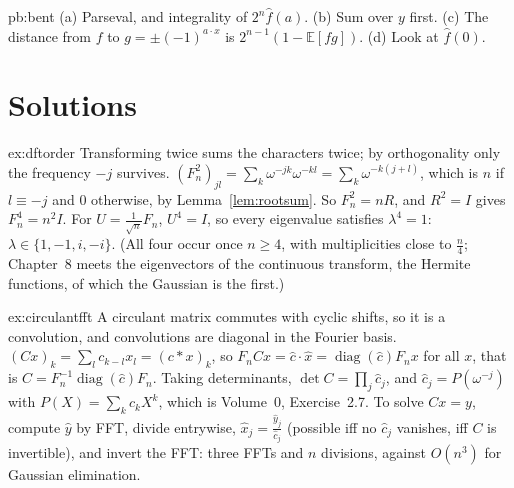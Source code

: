 \begin{hint}{pb:bent}
(a) Parseval, and integrality of $2^n\hat f(a)$. (b) Sum over $y$ first. (c) The distance from $f$ to $g=\pm(-1)^{a\cdot x}$ is
$2^{n-1}(1-\mathbb E[fg])$. (d) Look at $\hat f(0)$.
\end{hint}

\section{Solutions}

\begin{solution}{ex:dftorder}
\idea Transforming twice sums the characters twice; by orthogonality only the frequency $-j$ survives.
\writeup $(F_n^2)_{jl}=\sum_k\omega^{-jk}\omega^{-kl}=\sum_k\omega^{-k(j+l)}$, which is $n$ if $l\equiv-j$ and $0$ otherwise, by Lemma~\ref{lem:rootsum}. So $F_n^2=nR$, and
$R^2=I$ gives $F_n^4=n^2I$. For $U=\frac1{\sqrt n}F_n$, $U^4=I$, so every eigenvalue satisfies $\lambda^4=1$: $\lambda\in\{1,-1,i,-i\}$. (All four occur once
$n\ge4$, with multiplicities close to $\frac n4$; Chapter~8 meets the eigenvectors of the continuous transform, the Hermite
functions, of which the Gaussian is the first.)
\end{solution}

\begin{solution}{ex:circulantfft}
\idea A circulant matrix commutes with cyclic shifts, so it is a convolution, and convolutions are diagonal in the Fourier
basis.
\writeup $(Cx)_k=\sum_lc_{k-l}x_l=(c*x)_k$, so $F_nCx=\hat c\cdot\hat x=\operatorname{diag}(\hat c)F_nx$ for all $x$, that is $C=F_n^{-1}\operatorname{diag}(\hat c)F_n$. Taking
determinants, $\det C=\prod_j\hat c_j$, and $\hat c_j=P(\omega^{-j})$ with $P(X)=\sum_kc_kX^k$, which is Volume~0, Exercise~2.7. To solve $Cx=y$, compute $\hat y$ by
FFT, divide entrywise, $\hat x_j=\frac{\hat y_j}{\hat c_j}$ (possible iff no $\hat c_j$ vanishes, iff $C$ is invertible), and invert the FFT: three FFTs and $n$
divisions, against $O(n^3)$ for Gaussian elimination.
\end{solution}

